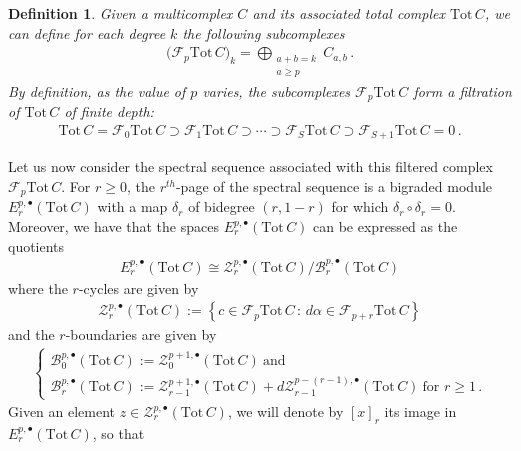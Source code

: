 \documentclass[10pt]{amsart}
\newcounter{dummy} \numberwithin{dummy}{section}
\newtheorem{definition}[dummy]{Definition}
\theoremstyle{remark}
\numberwithin{equation}{section}
\begin{document}
\begin{definition}
    Given a multicomplex $C$ and its associated total complex $\mathrm{Tot}\,C$, we can define for each degree $k$ the following subcomplexes
    \begin{align*}
        \big(\mathcal{F}_p\mathrm{Tot\,}C\big)_k=\bigoplus_{\substack{a+b=k\\ a\ge p}}C_{a,b}\,.
    \end{align*}
    By definition, as the value of $p$ varies, the subcomplexes $\mathcal{F}_p\mathrm{Tot}\,C$ form a filtration of $\mathrm{Tot}\,C$ of finite depth:
    \begin{align*}
        \mathrm{Tot}\,C=\mathcal{F}_0\mathrm{Tot}\,C\supset\mathcal{F}_1\mathrm{Tot}\,C\supset\cdots\supset\mathcal{F}_S\mathrm{Tot}\,C\supset\mathcal{F}_{S+1}\mathrm{Tot}\,C=0\,.
    \end{align*}
\end{definition}
Let us now consider the spectral sequence associated with this filtered complex $\mathcal{F}_p\mathrm{Tot}\,C$. For $r\ge 0$, the $r^{th}$-page of the spectral sequence is a bigraded module $E_r^{p,\bullet}(\mathrm{Tot}\,C)$ with a map $\delta_r$ of bidegree $(r,1-r)$ for which $\delta_r\circ \delta_r=0$. Moreover, we have that the spaces $E_r^{p,\bullet}(\mathrm{Tot}\,C)$ can be expressed as the quotients
\begin{align*}
    E_r^{p,\bullet}(\mathrm{Tot}\,C)\cong\mathcal{Z}_r^{p,\bullet}(\mathrm{Tot}\,C)/\mathcal{B}^{p,\bullet}_r(\mathrm{Tot}\,C)
\end{align*}
where the $r$-cycles are given by
\begin{align*}
    \mathcal{Z}_r^{p,\bullet}(\mathrm{Tot}\,C):= \left\{ c \in \mathcal{F}_p\mathrm{Tot}\,C \, : \, d\alpha \in \mathcal{F}_{p+r}\mathrm{Tot}\,C \right\} 
\end{align*}
and the $r$-boundaries are given by
\begin{align*}
    \begin{cases}
        \mathcal{B}_0^{p,\bullet}(\mathrm{Tot}\,C):=\mathcal{Z}_0^{p+1,\bullet}(\mathrm{Tot}\,C)\ \text{
         and 
        }\\ \mathcal{B}_r^{p,\bullet}(\mathrm{Tot}\,C):=\mathcal{Z}_{r-1}^{p+1,\bullet}(\mathrm{Tot}\,C)+d\mathcal{Z}_{r-1}^{p-(r-1),\bullet}(\mathrm{Tot}\,C)\ \text{
         for 
        }r\ge 1\,.
    \end{cases}
\end{align*}
Given an element $z\in\mathcal{Z}_r^{p,\bullet}(\mathrm{Tot}\,C)$, we will denote by $[x]_r$ its image in $E^{p,\bullet}_r(\mathrm{Tot}\,C)$, so that
\end{document}
